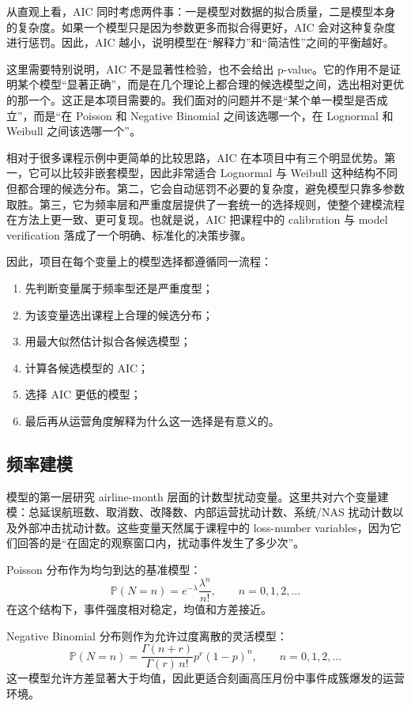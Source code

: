 \documentclass[UTF8,fontset=fandol,11pt]{ctexart}
\begin{document}
从直观上看，AIC 同时考虑两件事：一是模型对数据的拟合质量，二是模型本身的复杂度。如果一个模型只是因为参数更多而拟合得更好，AIC 会对这种复杂度进行惩罚。因此，AIC 越小，说明模型在“解释力”和“简洁性”之间的平衡越好。

这里需要特别说明，AIC 不是显著性检验，也不会给出 p-value。它的作用不是证明某个模型“显著正确”，而是在几个理论上都合理的候选模型之间，选出相对更优的那一个。这正是本项目需要的。我们面对的问题并不是“某个单一模型是否成立”，而是“在 Poisson 和 Negative Binomial 之间该选哪一个，在 Lognormal 和 Weibull 之间该选哪一个”。

相对于很多课程示例中更简单的比较思路，AIC 在本项目中有三个明显优势。第一，它可以比较非嵌套模型，因此非常适合 Lognormal 与 Weibull 这种结构不同但都合理的候选分布。第二，它会自动惩罚不必要的复杂度，避免模型只靠多参数取胜。第三，它为频率层和严重度层提供了一套统一的选择规则，使整个建模流程在方法上更一致、更可复现。也就是说，AIC 把课程中的 calibration 与 model verification 落成了一个明确、标准化的决策步骤。

因此，项目在每个变量上的模型选择都遵循同一流程：
\begin{enumerate}
  \item 先判断变量属于频率型还是严重度型；
  \item 为该变量选出课程上合理的候选分布；
  \item 用最大似然估计拟合各候选模型；
  \item 计算各候选模型的 AIC；
  \item 选择 AIC 更低的模型；
  \item 最后再从运营角度解释为什么这一选择是有意义的。
\end{enumerate}

\subsection{频率建模}
模型的第一层研究 airline-month 层面的计数型扰动变量。这里共对六个变量建模：总延误航班数、取消数、改降数、内部运营扰动计数、系统/NAS 扰动计数以及外部冲击扰动计数。这些变量天然属于课程中的 loss-number variables，因为它们回答的是“在固定的观察窗口内，扰动事件发生了多少次”。

Poisson 分布作为均匀到达的基准模型：
\[
\mathbb{P}(N=n)=e^{-\lambda}\frac{\lambda^n}{n!}, \qquad n=0,1,2,\dots
\]
在这个结构下，事件强度相对稳定，均值和方差接近。

Negative Binomial 分布则作为允许过度离散的灵活模型：
\[
\mathbb{P}(N=n)=\frac{\Gamma(n+r)}{\Gamma(r)\,n!}p^r(1-p)^n,
\qquad n=0,1,2,\dots
\]
这一模型允许方差显著大于均值，因此更适合刻画高压月份中事件成簇爆发的运营环境。
\end{document}
